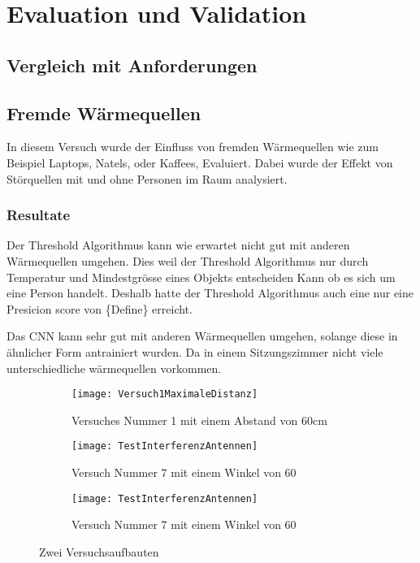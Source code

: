 \chapter{Evaluation und Validation}
\label{ch:Eval}

\section{Vergleich mit Anforderungen}
\label{sec:VergleichAnforderungen}

\section{Fremde Wärmequellen}
\label{sec:FremdeWärmequellen}

In diesem Versuch wurde der Einfluss von fremden Wärmequellen wie zum Beispiel Laptops, Natels, oder Kaffees, Evaluiert. Dabei wurde der Effekt von Störquellen mit und ohne Personen im Raum analysiert.

\subsection{Resultate}
\label{subsec:FWresultate}

Der Threshold Algorithmus kann wie erwartet nicht gut mit anderen Wärmequellen umgehen. Dies weil der Threshold Algorithmus nur durch Temperatur und Mindestgrösse eines Objekts entscheiden Kann ob es sich um eine Person handelt. Deshalb hatte der Threshold Algorithmus auch eine nur eine Presicion score von \{Define\} erreicht.

Das CNN kann sehr gut mit anderen Wärmequellen umgehen, solange diese in ähnlicher Form antrainiert wurden. Da in einem Sitzungszimmer nicht viele unterschiedliche wärmequellen vorkommen.

\begin{figure}[h!]
	\begin{subfigure}{.3\linewidth}
		\texttt{[image: Versuch1MaximaleDistanz]}
		\caption{Versuches Nummer 1 mit einem Abstand von 60cm}
		\label{fig:versuchaufbaunmr1}
	\end{subfigure}\hfill%
	\begin{subfigure}{.3\linewidth}
		\centering
		\texttt{[image: TestInterferenzAntennen]}
		\caption{Versuch Nummer 7 mit einem Winkel von 60\SIUnitSymbolDegree}
		\label{fig:versuchaufbaunmr7}
	\end{subfigure}
\begin{subfigure}{.3\linewidth}
	\centering
	\texttt{[image: TestInterferenzAntennen]}
	\caption{Versuch Nummer 7 mit einem Winkel von 60\SIUnitSymbolDegree}
	\label{fig:versuchaufbaunmr7}
\end{subfigure}
	\caption{Zwei Versuchsaufbauten}
	\label{fig:versuchsaufbauten}
\end{figure}

